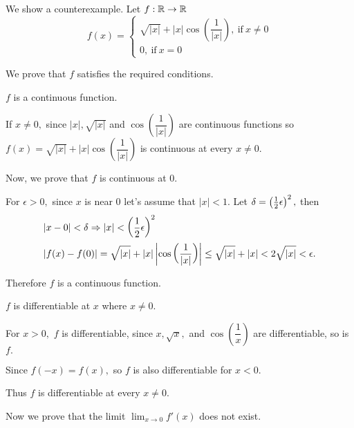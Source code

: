 \documentclass{article}
\begin{document}
\begin{soln}
    We show a counterexample. Let $f: \mathbb R \rightarrow \mathbb R$
    \[
        f(x) = 
        \begin{cases}
            \sqrt{|x|} + |x| \cos \left( \dfrac{1}{|x|} \right),\ \text{if}\ x \ne 0\\
            0,\ \text{if}\ x = 0
        \end{cases}
    \]

    We prove that $f$ satisfies the required conditions.
    \begin{claim*}
        $f$ is a continuous function.
    \end{claim*}
    \begin{subproof}
        If $x \ne 0,$ since $|x|, \sqrt{|x|}$ and $\cos \left( \dfrac{1}{|x|} \right)$ are continuous functions
        so $f(x) = \sqrt{|x|} + |x| \cos \left( \dfrac{1}{|x|} \right)$ is continuous at every $x \ne 0.$
    
        Now, we prove that $f$ is continuous at $0.$
    
        For $\epsilon > 0,$ since $x$ is near $0$ let's assume that $|x| < 1.$ 
        Let $\delta = \left(\frac{1}{2} \epsilon \right)^2,$ then
        \[
            \begin{aligned}
                &|x - 0| < \delta \Rightarrow |x| < \left(\frac{1}{2} \epsilon \right)^2 \\
                &|f(x) - f(0)| = \sqrt{|x|} + |x| \left| \cos \left( \dfrac{1}{|x|} \right) \right| \le \sqrt{|x|} + |x| < 2 \sqrt{|x|} < \epsilon.
            \end{aligned}
        \]
    
        Therefore $f$ is a continuous function.
    \end{subproof}

    \begin{claim*}
        $f$ is differentiable at $x$ where $x \ne 0.$
    \end{claim*}
    \begin{subproof}
        For $x >0,$ $f$ is differentiable, since $x, \sqrt{x},$ and $\cos \left( \dfrac{1}{x} \right)$ are differentiable, so is $f.$

        Since $f(-x) = f(x),$ so $f$ is also differentiable for $x < 0.$

        Thus $f$ is differentiable at every $x \ne 0.$
    \end{subproof}

    Now we prove that the limit $\lim_{x \rightarrow 0} f'(x)$ does not exist. 


\end{soln}
\end{document}

